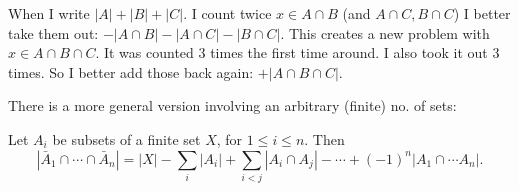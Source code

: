 \documentclass[10pt]{scrartcl}
\begin{document}
When I write $|A| + |B| + |C|$. I count twice $x \in A\cap B$ (and $A\cap C, B \cap C$) I better take them out: $- |A \cap B|- |A \cap C| - |B\cap C|$. 
This creates a new problem with $x \in A \cap B \cap C$. It was counted $3$ times the first time around. I also took it out $3$ times. So I better add those back again: $+|A \cap B\cap C|$.

There is a more general version involving an arbitrary (finite) no. of sets:

\begin{theorem}
  Let $A_i$ be subsets of a finite set $X$, for $1 \leq i\leq n$. Then
  \[
    |\bar A_1\cap \cdots \cap \bar A_n| = |X| - \sum_i |A_i| + \sum_{i < j}|A_i\cap A_j| -  \cdots + (-1)^n|A_1\cap \cdots A_n|.
  \]
\end{theorem}\vspace*{10pt}
\end{document}
